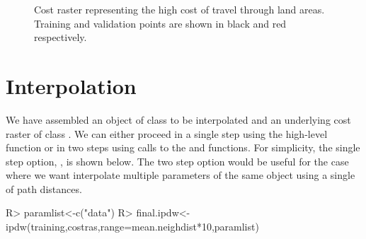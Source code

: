 \documentclass[nojss,shortnames]{jss}
\begin{document}
\begin{figure}[h!]
\begin{center}
\end{center}
\caption{Cost raster representing the high cost of travel through land areas. Training and validation points are shown in black and red respectively.}
\label{fig:zero}
\end{figure}
\FloatBarrier

\section{Interpolation}
We have assembled an object of class  to be interpolated and an underlying cost raster of class . We can either proceed in a single step using the high-level  function  or in two steps using calls to the  and  functions. For simplicity, the single step option, , is shown below. The two step option would be useful for the case where we want interpolate multiple parameters of the same  object using a single  of path distances.


\begin{Schunk}
\begin{Sinput}
R> paramlist<-c("data")
R> final.ipdw<-ipdw(training,costras,range=mean.neighdist*10,paramlist)
\end{Sinput}
\end{Schunk}
\end{document}
